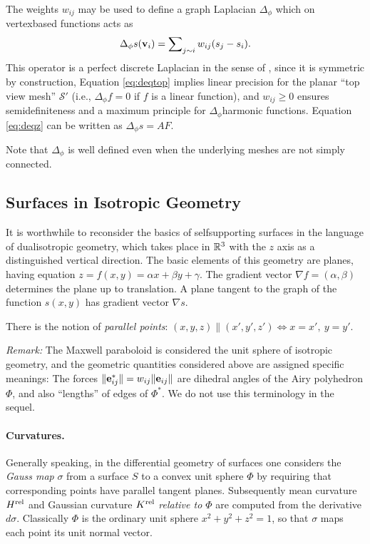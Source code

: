 \documentclass[review]{acmsiggraph}
\def\rel{{\mathord{{\rm rel}}}}
\def\SS{{\mathcal S}}
\begin{document}
The weights $w_{ij}$ may be used to define a graph Laplacian $\Delta_\phi$ 
which on vertex\dash based functions acts as
	\begin{align*}
	\Delta_{\phi} s({\mathbf v}_i)=\sum\nolimits_{j\sim i} w_{ij}(s_j-s_i).
	\end{align*}
 This operator is a perfect discrete Laplacian in the sense of 
\cite{wardetzky07}, since it is symmetric by construction, Equation 
\eqref{eq:deqtop} implies linear precision for the planar ``top view 
mesh'' $\SS'$ (i.e., $\Delta_\phi f=0$ if $f$ is a linear function), and 
$w_{ij}\ge 0$ ensures semidefiniteness and a maximum principle for 
$\Delta_\phi$\dash harmonic functions. Equation \eqref{eq:deqz} can be 
written as $\Delta_\phi s = AF$.

Note that $\Delta_\phi$ is well defined even when the underlying meshes 
are not simply connected.

\subsection{Surfaces in Isotropic Geometry} \label{sec:smooth}

It is worthwhile to reconsider the basics of self\dash supporting surfaces 
in the language of dual\dash isotropic geometry, which takes place in 
${\mathbb R}^3$ with the $z$ axis as a distinguished vertical direction. The basic 
elements of this geometry are planes, having equation $z=f(x,y) = \alpha 
x+\beta y+\gamma$. The gradient vector $\nabla f = (\alpha,\beta)$ 
determines the plane up to translation. A plane tangent to the graph of 
the function $s(x,y)$ has gradient vector $\nabla s$.

There is the notion of {\em parallel points}:
	$
	(x,y,z) \parallel (x',y',z') \iff
	x=x',\ y=y'
	.$

{\it Remark:} The Maxwell paraboloid is considered the unit sphere of isotropic 
geometry, and the geometric quantities considered above are assigned
specific meanings: The forces $\|{\mathbf e}_{ij}^*\|=w_{ij}\|{\mathbf e}_{ij}\|$
are dihedral angles of the Airy polyhedron $\Phi$, and also ``lengths'' of
edges of $\Phi^*$. We do not use this terminology in the sequel.

\paragraph{Curvatures.}

Generally speaking, in the differential geometry of surfaces one considers 
the {\em Gauss map} $\sigma$ from a surface $S$ to a convex unit sphere 
$\Phi$ by requiring that corresponding points have parallel tangent 
planes.  Subsequently mean curvature $H^\rel$ and Gaussian curvature 
$K^\rel$ {\em relative to $\Phi$} are computed from the derivative 
$d\sigma$. Classically $\Phi$ is the ordinary unit sphere $x^2+y^2+z^2=1$, 
so that $\sigma$ maps each point its unit normal vector.
\end{document}
